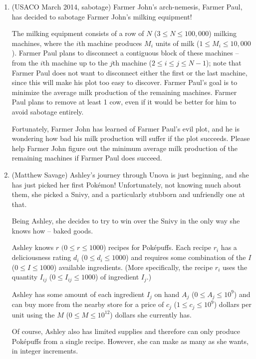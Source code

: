\documentclass[11pt]{book}
\begin{document}
\begin{enumerate}

\item
(USACO March 2014, sabotage)
Farmer John's arch-nemesis, Farmer Paul, has decided to sabotage Farmer
John's milking equipment!

The milking equipment consists of a row of $N$ ($3 \le N \le 100,000$)
milking machines, where the $i$th machine produces $M_i$ units of milk ($1 \le M_i \le 10,000$).  Farmer Paul plans to disconnect a contiguous block
of these machines -- from the $i$th machine up to the $j$th machine ($2 \le i \le j \le N-1$); note that Farmer Paul does not want to disconnect
either the first or the last machine, since this will make his plot
too easy to discover.  Farmer Paul's goal is to minimize the average
milk production of the remaining machines.  Farmer Paul plans to
remove at least 1 cow, even if it would be better for him to avoid
sabotage entirely.

Fortunately, Farmer John has learned of Farmer Paul's evil plot, and
he is wondering how bad his milk production will suffer if the plot
succeeds.  Please help Farmer John figure out the minimum average milk
production of the remaining machines if Farmer Paul does succeed.

\item
(Matthew Savage)
Ashley's journey through Unova is just beginning, and she has just picked her first Pok\'{e}mon! Unfortunately, not knowing much about them, she picked a Snivy, and a particularly stubborn and unfriendly one at that.

Being Ashley, she decides to try to win over the Snivy in the only way she knows how -- baked goods.

Ashley knows $r$ $(0 \le r \le 1000$) recipes for Pok\'{e}puffs. Each recipe $r_i$ has a deliciousness rating $d_i$ ($0 \le d_i \le 1000$) and requires some combination of the $I$ ($0 \le I \le 1000$) available ingredients. (More specifically, the recipe $r_i$ uses the quantity $I_{ij}$ ($0 \le I_{ij} \le 1000$) of ingredient $I_j$.)

Ashley has some amount of each ingredient $I_j$ on hand $A_j$ ($0 \le A_j \le 10^9$) and can buy more from the nearby store for a price of $c_j$ ($1 \le c_j \le 10^9$) dollars per unit using the $M$ ($0 \le M \le 10^{12}$) dollars she currently has.

Of course, Ashley also has limited supplies and therefore can only produce Pok\'{e}puffs from a single recipe. However, she can make as many as she wants, in integer increments.


\end{enumerate}
\end{document}
